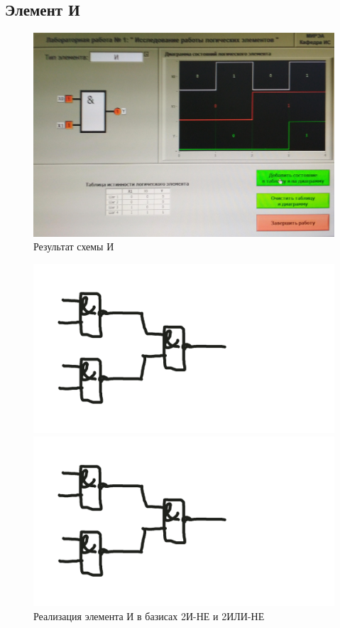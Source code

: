 \subsection{Элемент И}

\begin{figure}[H]
	\centering
	\includegraphics[width=0.85\linewidth]{imgs/1/and}
	\caption{Результат схемы И}
	\label{fig:1_and}
\end{figure}

\begin{figure}[H]
	\centering
	\begin{minipage}{.45\textwidth}
		\centering
		\includegraphics[width=0.85\linewidth]{imgs/1/and_and}
	\end{minipage}
	\begin{minipage}{.45\textwidth}
		\centering
		\includegraphics[width=0.85\linewidth]{imgs/1/and_or}
	\end{minipage}
	\caption{Реализация элемента И в базисах 2И-НЕ и 2ИЛИ-НЕ}
\end{figure}

